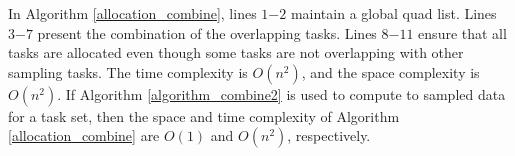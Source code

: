 \documentclass[prodmode,acmtosn]{acmsmall}
\begin{document}
%


In Algorithm \ref{allocation_combine}, lines $1\mathrm{-}2$ maintain a global quad list. Lines $3\mathrm{-}7$ present the combination of the overlapping tasks. Lines $8\mathrm{-}11$ ensure that all tasks are allocated even though some tasks are not overlapping with other sampling tasks. The time complexity is $O(n^2)$, and the space complexity is $O(n^2)$. If  Algorithm \ref{algorithm_combine2} is used to compute to sampled data for a task set, then the space and time complexity of Algorithm \ref{allocation_combine} are $O(1)$ and $O(n^2)$, respectively.
\end{document}
